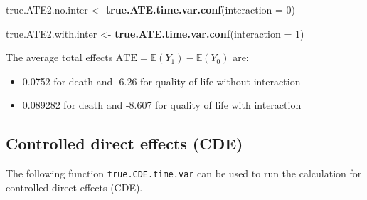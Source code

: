 \documentclass[
]{book}
\newenvironment{Shaded}{\begin{snugshade}}{\end{snugshade}}
\newcommand{\AttributeTok}[1]{\textcolor[rgb]{0.13,0.29,0.53}{#1}}
\newcommand{\DecValTok}[1]{\textcolor[rgb]{0.00,0.00,0.81}{#1}}
\newcommand{\FunctionTok}[1]{\textcolor[rgb]{0.13,0.29,0.53}{\textbf{#1}}}
\newcommand{\NormalTok}[1]{#1}
\newcommand{\OtherTok}[1]{\textcolor[rgb]{0.56,0.35,0.01}{#1}}
\providecommand{\tightlist}{%
  \setlength{\itemsep}{0pt}\setlength{\parskip}{0pt}}
\begin{document}
\begin{Shaded}
\begin{Highlighting}[]
\NormalTok{true.ATE2.no.inter }\OtherTok{\textless{}{-}} \FunctionTok{true.ATE.time.var.conf}\NormalTok{(}\AttributeTok{interaction =} \DecValTok{0}\NormalTok{)}

\NormalTok{true.ATE2.with.inter }\OtherTok{\textless{}{-}} \FunctionTok{true.ATE.time.var.conf}\NormalTok{(}\AttributeTok{interaction =} \DecValTok{1}\NormalTok{)}
\end{Highlighting}
\end{Shaded}

The average total effects \(\text{ATE} = \mathbb{E}(Y_1) - \mathbb{E}(Y_0)\) are:

\begin{itemize}
\tightlist
\item
  0.0752 for death and -6.26 for quality of life without interaction
\item
  0.089282 for death and -8.607 for quality of life with interaction
\end{itemize}

\subsection{Controlled direct effects (CDE)}\label{controlled-direct-effects-cde-1}

The following function \texttt{true.CDE.time.var} can be used to run the calculation for controlled direct effects (CDE).
\end{document}
